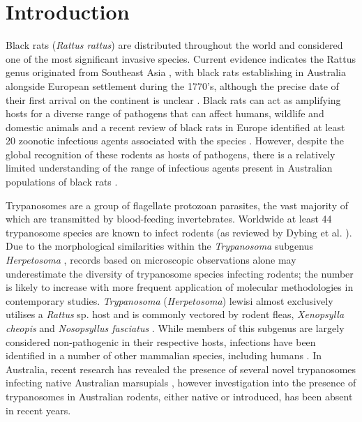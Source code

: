 \documentclass[a4paper, nobind]{templates/ociamthesis}
\begin{document}
\hypertarget{introduction-3}{%
\section{Introduction}\label{introduction-3}}

Black rats (\emph{Rattus rattus}) are distributed throughout the world and considered one of the most significant invasive species. Current evidence indicates the Rattus genus originated from Southeast Asia \autocite{aplinMultipleGeographicOrigins2011}, with black rats establishing in Australia alongside European settlement during the 1770's, although the precise date of their first arrival on the continent is unclear \autocite{banksReviewEvidencePotential2012}. Black rats can act as amplifying hosts for a diverse range of pathogens that can affect humans, wildlife and domestic animals and a recent review of black rats in Europe identified at least 20 zoonotic infectious agents associated with the species \autocite{strandRatborneDiseasesHorizon2019}. However, despite the global recognition of these rodents as hosts of pathogens, there is a relatively limited understanding of the range of infectious agents present in Australian populations of black rats \autocite{banksReviewEvidencePotential2012}.

Trypanosomes are a group of flagellate protozoan parasites, the vast majority of which are transmitted by blood-feeding invertebrates. Worldwide at least 44 trypanosome species are known to infect rodents (as reviewed by Dybing et al. \autocite*{dybingGhostsChristmasAbsence2016}). Due to the morphological similarities within the \emph{Trypanosoma} subgenus \emph{Herpetosoma} \autocite{maiadasilvaPhylogeneticMorphologicalBehavioural2010,ortizDiagnosisGeneticAnalysis2018}, records based on microscopic observations alone may underestimate the diversity of trypanosome species infecting rodents; the number is likely to increase with more frequent application of molecular methodologies in contemporary studies. \emph{Trypanosoma} (\emph{Herpetosoma}) lewisi almost exclusively utilises a \emph{Rattus} sp. host and is commonly vectored by rodent fleas, \emph{Xenopsylla cheopis} and \emph{Nosopsyllus fasciatus} \autocite{ortizDiagnosisGeneticAnalysis2018}. While members of this subgenus are largely considered non-pathogenic in their respective hosts, infections have been identified in a number of other mammalian species, including humans \autocite{maiadasilvaPhylogeneticMorphologicalBehavioural2010,ortizDiagnosisGeneticAnalysis2018}. In Australia, recent research has revealed the presence of several novel trypanosomes infecting native Australian marsupials \autocite{thompsonTrypanosomesAustralianMammals2014}, however investigation into the presence of trypanosomes in Australian rodents, either native or introduced, has been absent in recent years.
\end{document}
